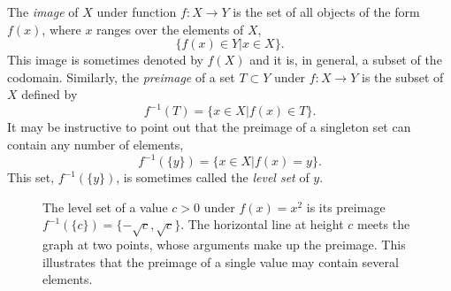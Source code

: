 The \emph{image} of $X$ under function $f: X \rightarrow Y$ is the set of all objects of the form $f(x)$, where $x$ ranges over the elements of $X$,
\begin{equation*}
\{ f(x) \in Y | x \in X \} .
\end{equation*}
This image is sometimes denoted by $f(X)$ and it is, in general, a subset of the codomain.
Similarly, the \emph{preimage} of a set $T \subset Y$ under $f: X \rightarrow Y$ is the subset of $X$ defined by
\begin{equation*}
f^{-1} (T) = \{ x \in X | f(x) \in T \} .
\end{equation*}
It may be instructive to point out that the preimage of a singleton set can contain any number of elements,
\begin{equation*}
f^{-1} (\{ y \}) = \{ x \in X | f(x) = y \} .
\end{equation*}
This set, $f^{-1} (\{ y \})$, is sometimes called the \emph{level set} of $y$.

\begin{figure}[htb]
\begin{center}
\caption{The level set of a value $c > 0$ under $f(x) = x^2$ is its preimage $f^{-1} (\{ c \}) = \{ -\sqrt{c}, \sqrt{c} \}$.
The horizontal line at height $c$ meets the graph at two points, whose arguments make up the preimage.
This illustrates that the preimage of a single value may contain several elements.}
\end{center}
\end{figure}

